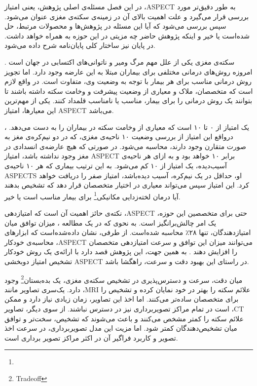 

در این فصل مسئله‌ی اصلی پژوهش، یعنی امتیاز ،ASPECT به طور دقیق‌تر مورد بررسی قرار می‌گیرد و علت اهمیت بالای آن در زمینه‌ی سکته‌ی مغزی عنوان می‌شود.
سپس بررسی می‌شود که آیا این مسئله در پژوهش‌ها و محصولات مرتبط، حل شده‌است یا خیر و اینکه پژوهش حاضر چه مزیتی در این حوزه به همراه خواهد داشت.
در پایان نیز ساختار کلی پایان‌نامه شرح داده می‌شود.


سکته‌ی مغزی یکی از علل مهم مرگ ومیر و ناتوانی‌های اکتسابی در جهان است \cite{donkor2018stroke}.
امروزه روش‌های درمانی مختلفی برای بیماران مبتلا به این عارضه وجود دارد.
اما تجویز روش درمانی مناسب برای هر بیمار با توجه به وضعیت وی، متفاوت است.
در واقع لازم است که متخصصان، ملاک و معیاری از وضعیت پیشرفت و وخامت سکته داشته باشند تا بتوانند یک روش درمانی را برای بیمار، مناسب یا نامناسب قلمداد کنند.
یکی از مهم‌ترین این معیارها، امتیاز ASPECT می‌باشد.

\cite{barber2000validity}،
یک امتیاز از ۰ تا ۱۰ است که معیاری از وخامت سکته در بیماران را به دست می‌دهد.
درواقع این امتیاز از بررسی وضعیت ۱۰ ناحیه‌ی مغزی، که در دو نیم‌کره‌ی مغز به صورت متقارن وجود دارند، محاسبه می‌شود.
در صورتی که هیچ عارضه‌ی انسدادی در مغز وجود نداشته باشد، امتیاز ASPECT برابر ۱۰ خواهد بود و به ازای هر ناحیه‌ی آسیب‌دیده، یک امتیاز از ۱۰ کم می‌شود.
به این ترتیب بیماری که هر ۱۰ ناحیه‌ی ASPECTS او، حداقل در یک نیم‌کره، آسیب دیده‌باشد، امتیاز صفر را دریافت خواهد کرد.
این امتیاز سپس می‌تواند معیاری در اختیار متخصصان قرار دهد که تشخیص بدهند آیا درمان 
لخته‌زدایی مکانیکی\footnote{}
برای بیمار مناسب است یا خیر.

نکته‌ی حائز اهمیت آن است که امتیازدهی ،ASPECT حتی برای متخصصین این حوزه، یک امر چالش‌بر‌انگیز است.
به نحوی که در یک مطالعه \cite{van2021aspects}،
میزان توافق میان امتیازدهندگان، تنها ۲۸٪ محاسبه شده‌است.
از طرفی، نشان داده‌شده‌است که ابزار‌های محاسبه‌ی خودکار ،ASPECT می‌توانند
میزان این توافق و سرعت امتیازدهی متخصصان را افزایش دهند \cite{chen2022improving}.
به همین جهت، این پژوهش قصد دارد با ارائه‌ی یک روش خودکار تشخیص امتیاز دوبخشی ASPECT 
در راستای این بهبود دقت و سرعت، راهگشا باشد.

میان دقت، سرعت و دسترس‌پذیری در تشخیص سکته‌ی مغزی، یک 
بده‌بستان\footnote{Tradeoff}
وجود دارد.
یک‌سری تصاویر مانند ،MRI علائم سکته را بهتر در خود نمایان کرده و تشخیص را برای متخصصان ساده‌تر می‌کنند.
اما اخذ این تصاویر، زمان زیادی نیاز دارد و ممکن است در تمام مراکز تصویر‌برداری نیز در دسترس نباشند.
از سوی دیگر، تصاویر ،CT علائم سکته را کمتر مشخص می‌کنند و باعث می‌شوند که تشخیص، سخت‌تر و توافق میان تشخیص‌دهندگان کمتر شود.
اما مزیت این مدل تصویربرداری، در سرعت اخذ تصویر و کاربرد فراگیر آن در اکثر مراکز تصویر برداری است.

